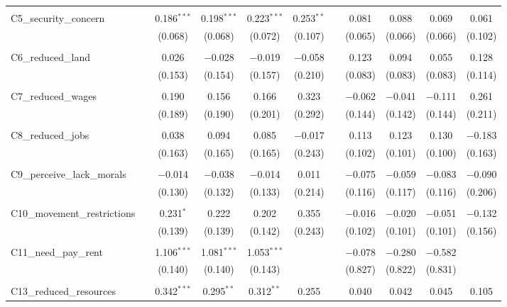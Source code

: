\begin{table}[H]
\begin{tabular}{@{\extracolsep{4pt}}lcccccccccc}
  & & & & & & & & & & \\ 
 C5\_security\_concern &  & 0.186$^{***}$ & 0.198$^{***}$ & 0.223$^{***}$ & 0.253$^{**}$ &  & 0.081 & 0.088 & 0.069 & 0.061 \\ 
  &  & (0.068) & (0.068) & (0.072) & (0.107) &  & (0.065) & (0.066) & (0.066) & (0.102) \\ 
  & & & & & & & & & & \\ 
 C6\_reduced\_land &  & 0.026 & $-$0.028 & $-$0.019 & $-$0.058 &  & 0.123 & 0.094 & 0.055 & 0.128 \\ 
  &  & (0.153) & (0.154) & (0.157) & (0.210) &  & (0.083) & (0.083) & (0.083) & (0.114) \\ 
  & & & & & & & & & & \\ 
 C7\_reduced\_wages &  & 0.190 & 0.156 & 0.166 & 0.323 &  & $-$0.062 & $-$0.041 & $-$0.111 & 0.261 \\ 
  &  & (0.189) & (0.190) & (0.201) & (0.292) &  & (0.144) & (0.142) & (0.144) & (0.211) \\ 
  & & & & & & & & & & \\ 
 C8\_reduced\_jobs &  & 0.038 & 0.094 & 0.085 & $-$0.017 &  & 0.113 & 0.123 & 0.130 & $-$0.183 \\ 
  &  & (0.163) & (0.165) & (0.165) & (0.243) &  & (0.102) & (0.101) & (0.100) & (0.163) \\ 
  & & & & & & & & & & \\ 
 C9\_perceive\_lack\_morals &  & $-$0.014 & $-$0.038 & $-$0.014 & 0.011 &  & $-$0.075 & $-$0.059 & $-$0.083 & $-$0.090 \\ 
  &  & (0.130) & (0.132) & (0.133) & (0.214) &  & (0.116) & (0.117) & (0.116) & (0.206) \\ 
  & & & & & & & & & & \\ 
 C10\_movement\_restrictions &  & 0.231$^{*}$ & 0.222 & 0.202 & 0.355 &  & $-$0.016 & $-$0.020 & $-$0.051 & $-$0.132 \\ 
  &  & (0.139) & (0.139) & (0.142) & (0.243) &  & (0.102) & (0.101) & (0.101) & (0.156) \\ 
  & & & & & & & & & & \\ 
 C11\_need\_pay\_rent &  & 1.106$^{***}$ & 1.081$^{***}$ & 1.053$^{***}$ &  &  & $-$0.078 & $-$0.280 & $-$0.582 &  \\ 
  &  & (0.140) & (0.140) & (0.143) &  &  & (0.827) & (0.822) & (0.831) &  \\ 
  & & & & & & & & & & \\ 
 C13\_reduced\_resources &  & 0.342$^{***}$ & 0.295$^{**}$ & 0.312$^{**}$ & 0.255 &  & 0.040 & 0.042 & 0.045 & 0.105 \\ 

\end{tabular}
\end{table}
